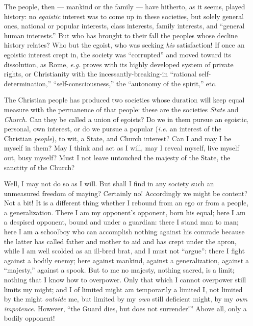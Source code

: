The people, then --- mankind or the family --- have hitherto, as it seems, 
played history: no \textit{egoistic} interest was to come up in these 
societies, but solely general ones, national or popular interests, class 
interests, family interests, and ``general human interests.'' But who has 
brought to their fall the peoples whose decline history relates? Who but the 
egoist, who was seeking \textit{his} satisfaction! If once an egoistic 
interest crept in, the society was ``corrupted'' and moved toward its 
dissolution, as Rome, \textit{e.g.} proves with its highly developed system 
of private rights, or Christianity with the incessantly-breaking-in 
``rational self-determination,'' ``self-consciousness,'' the ``autonomy 
of the spirit,'' etc.

The Christian people has produced two societies whose duration will keep equal 
measure with the permanence of that people: these are the societies 
\textit{State} and \textit{Church}. Can they be called a union of egoists? Do 
we in them pursue an egoistic, personal, own interest, or do we pursue a 
popular (\textit{i.e.} an interest of the Christian \textit{people}), to wit, 
a State, and Church interest? Can I and may I be myself in them? May I think 
and act as I will, may I reveal myself, live myself out, busy myself? Must I 
not leave untouched the majesty of the State, the sanctity of the Church?

Well, I may not do so as I will. But shall I find in any society such an 
unmeasured freedom of maying? Certainly no! Accordingly we might be content? 
Not a bit! It is a different thing whether I rebound from an ego or from a 
people, a generalization. There I am my opponent's opponent, born his equal; 
here I am a despised opponent, bound and under a guardian: there I stand man 
to man; here I am a schoolboy who can accomplish nothing against his comrade 
because the latter has called father and mother to aid and has crept under the 
apron, while I am well scolded as an ill-bred brat, and I must not 
``argue'': there I fight against a bodily enemy; here against mankind, 
against a generalization, against a ``majesty,'' against a spook. But to me 
no majesty, nothing sacred, is a limit; nothing that I know how to overpower. 
Only that which I cannot overpower still limits my might; and I of limited 
might am temporarily a limited I, not limited by the might \textit{outside} 
me, but limited by my \textit{own} still deficient might, by my \textit{own 
impotence}. However, ``the Guard dies, but does not surrender!'' Above all, 
only a bodily opponent!


